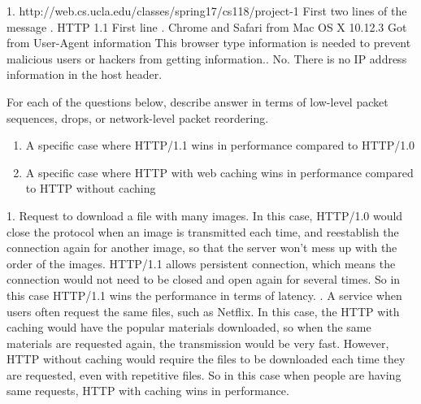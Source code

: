 \documentclass{report}
\begin{document}
\begin{problem}
\begin{answer}{30em}
    1. http://web.cs.ucla.edu/classes/spring17/cs118/project-1 \newline
    First two lines of the message \newline {}. HTTP 1.1 \newline First line \newline {}. Chrome and Safari from Mac OS X 10.12.3 \newline 
    Got from User-Agent information \newline
    This browser type information is needed to prevent malicious users or hackers from getting information.\newline {}. No. There is no IP address information in the host header.
\end{answer}

\end{problem}


\newpage



\begin{problem}
For each of the questions below, describe answer in terms of low-level packet sequences, drops, or network-level packet reordering.

\begin{enumerate}
  
\item A specific case where HTTP/1.1 wins in performance compared to HTTP/1.0

\item A specific case where HTTP with web caching wins in performance compared to HTTP without caching

\end{enumerate}

\begin{answer}{30em}
    1. Request to download a file with many images. In this case, HTTP/1.0 would close the protocol when an image is transmitted each time, and reestablish the connection again for another image, so that the server won't mess up with the order of the images. HTTP/1.1 allows persistent connection, which means the connection would not need to be closed and open again for several times. So in this case HTTP/1.1 wins the performance in terms of latency. \newline
    . A service when users often request the same files, such as Netflix. In this case, the HTTP with caching would have the popular materials downloaded, so when the same materials are requested again, the transmission would be very fast. However, HTTP without caching would require the files to be downloaded each time they are requested, even with repetitive files. So in this case when people are having same requests, HTTP with caching wins in performance.\newline
\end{answer}

\end{problem}
\end{document}
